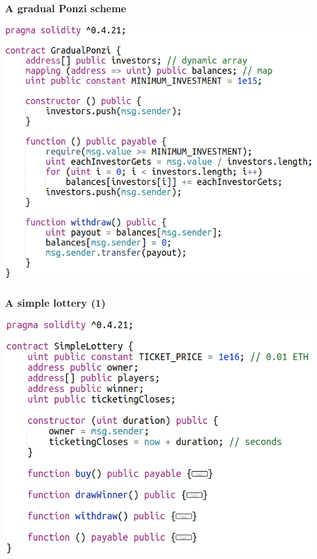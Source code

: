 \documentclass[11pt]{beamer}  %
\begin{document}
\begin{frame}\frametitle{A gradual Ponzi scheme}

  \begin{center}
    \includegraphics[scale=0.4,clip=false]{pictures/gradual-ponzi.png}
  \end{center}

\end{frame}

\begin{frame}\frametitle{A simple lottery (1)}

  \begin{center}
    \includegraphics[scale=0.4,clip=false]{pictures/simple-lottery-1.png}
  \end{center}

\end{frame}
\end{document}
